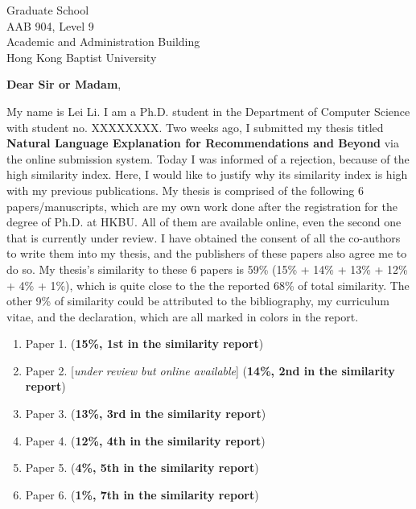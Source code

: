\documentclass[10pt]{letter} %
\begin{document}

\begin{letter}{Graduate School \\ AAB 904, Level 9 \\ Academic and Administration Building \\ Hong Kong Baptist University} %


\opening{\textbf{Dear Sir or Madam},}

My name is Lei Li.
I am a Ph.D. student in the Department of Computer Science with student no. XXXXXXXX.
Two weeks ago, I submitted my thesis titled \textbf{Natural Language Explanation for Recommendations and Beyond} via the online submission system.
Today I was informed of a rejection, because of the high similarity index.
Here, I would like to justify why its similarity index is high with my previous publications.
My thesis is comprised of the following 6 papers/manuscripts, which are my own work done after the registration for the degree of Ph.D. at HKBU.
All of them are available online, even the second one that is currently under review.
I have obtained the consent of all the co-authors to write them into my thesis, and the publishers of these papers also agree me to do so.
My thesis's similarity to these 6 papers is 59\% (15\% + 14\% + 13\% + 12\% + 4\% + 1\%), which is quite close to the the reported 68\% of total similarity.
The other 9\% of similarity could be attributed to the bibliography, my curriculum vitae, and the declaration, which are all marked in colors in the report.
\begin{enumerate}
	\item Paper 1. (\textbf{15\%, 1st in the similarity report})
	\item Paper 2. [\textit{under review but online available}] (\textbf{14\%, 2nd in the similarity report})
	\item Paper 3. (\textbf{13\%, 3rd in the similarity report})
	\item Paper 4. (\textbf{12\%, 4th in the similarity report})
	\item Paper 5. (\textbf{4\%, 5th in the similarity report})	
	\item Paper 6. (\textbf{1\%, 7th in the similarity report})	
\end{enumerate}


\end{letter}
\end{document}
